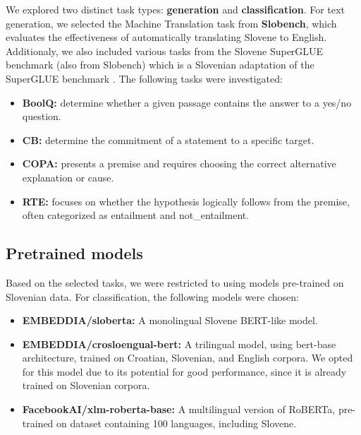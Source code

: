 \documentclass[fleqn,moreauthors,10pt]{ds_report}
\begin{document}
    We explored two distinct task types: \textbf{generation} and \textbf{classification}. For text generation, we selected the Machine Translation task from \textbf{Slobench}, which evaluates the effectiveness of automatically translating Slovene to English. Additionaly, we also included various tasks from the Slovene SuperGLUE benchmark (also from Slobench) which is a Slovenian adaptation of the SuperGLUE benchmark \cite{sarlin2020superglue}. The following tasks were investigated:
    
    \begin{itemize}
        \item \textbf{BoolQ:} determine whether a given passage contains the answer to a yes/no question.
        \item \textbf{CB:} determine the commitment of a statement to a specific target.
        \item \textbf{COPA:} presents a premise and requires choosing the correct alternative explanation or cause.
        \item \textbf{RTE:} focuses on whether the hypothesis logically follows from the premise, often categorized as entailment and not\_entailment.
     \end{itemize}
     
    \subsection*{Pretrained models}
    Based on the selected tasks, we were restricted to using models pre-trained on Slovenian data. For classification, the following models were chosen:
    
    \begin{itemize}
        \item \textbf{EMBEDDIA/sloberta:} A monolingual Slovene BERT-like model.
        \item \textbf{EMBEDDIA/crosloengual-bert:} A trilingual mo\-del, using bert-base architecture, trained on Croatian, Slovenian, and English corpora. We opted for this model due to its potential for good performance, since it is already trained on Slovenian corpora.
        \item \textbf{FacebookAI/xlm-roberta-base:} A multilingual version of RoBERTa, pre-trained on dataset containing 100 languages, including Slovene.
    \end{itemize}
\end{document}
